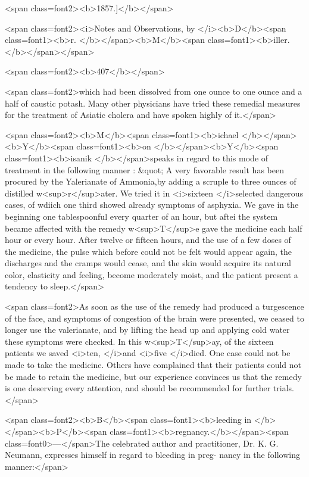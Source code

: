 <span class=font2><b>1857.]</b></span>

<span class=font2><i>Notes and Observations, by </i><b>D</b><span class=font1><b>r. </b></span><b>M</b><span class=font1><b>iller.</b></span></span>

<span class=font2><b>407</b></span>

<span class=font2>which had been dissolved from one ounce to one ounce and a half of
caustic potash. Many other physicians have tried these remedial
measures for the treatment of Asiatic cholera and have spoken highly
of it.</span>

<span class=font2><b>M</b><span class=font1><b>ichael </b></span><b>Y</b><span class=font1><b>on </b></span><b>Y</b><span class=font1><b>isanik </b></span>speaks in regard to this mode of treatment
in the following manner : &quot; A very favorable result has been procured
by the Yalerianate of Ammonia,by adding a scruple to three ounces of
distilled w<sup>r</sup>ater. We tried it in <i>sixteen </i>selected dangerous cases, of
wdiich one third showed already symptoms of asphyxia. We gave in
the beginning one tablespoonful every quarter of an hour, but aftei
the system became affected with the remedy w<sup>T</sup>e gave the medicine
each half hour or every hour. After twelve or fifteen hours, and the
use of a few doses of the medicine, the pulse which before could not
be felt would appear again, the discharges and the cramps would cease,
and the skin would acquire its natural color, elasticity and feeling,
become moderately moist, and the patient present a tendency to sleep.</span>

<span class=font2>As soon as the use of the remedy had produced a turgescence of the
face, and symptoms of congestion of the brain were presented, we
ceased to longer use the valerianate, and by lifting the head up and
applying cold water these symptoms were checked. In this w<sup>T</sup>ay, of
the sixteen patients we saved <i>ten, </i>and <i>five </i>died. One case could not
be made to take the medicine. Others have complained that their
patients could not be made to retain the medicine, but our experience
convinces us that the remedy is one deserving every attention, and
should be recommended for further trials.</span>

<span class=font2><b>B</b><span class=font1><b>leeding in </b></span><b>P</b><span class=font1><b>regnancy.</b></span><span class=font0>---</span>The celebrated author and practitioner,
Dr. K. G. Neumann, expresses himself in regard to bleeding in preg-
nancy in the following manner:</span>

